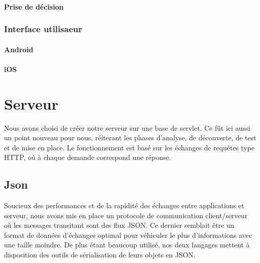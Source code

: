 \documentclass[]{report}
\begin{document}
				\paragraph{Prise de décision}
			\subsubsection{Interface utilisaeur}
				\paragraph{Android}
				\paragraph{iOS}
		
	\section{Serveur}
		Nous avons choisi de créer notre serveur sur une base de servlet. Ce fût ici
		aussi un point nouveau pour nous, réiterant les phases d'analyse, de
		découverte, de test et de mise en place. Le fonctionnement est basé sur les
		échanges de requêtes type HTTP, où à chaque demande correspond une réponse. 
		
		\subsection{Json}
		Soucieux des performances et de la rapidité des échanges entre applications et
		serveur, nous avons mis en place un protocole de communication client/serveur
		où les messages transitant sont des flux JSON. Ce dernier semblait être un
		format de données d'échanges optimal pour véhiculer le plus d'informations
		avec une taille moindre. De plus étant beaucoup utilisé, nos deux langages
		mettent à disposition des outils de sérialisation de leurs objets en JSON.
		
\end{document}
